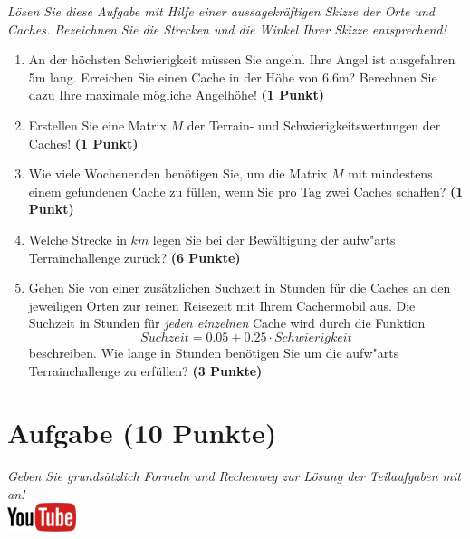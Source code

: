 \documentclass[a4paper, 10pt]{scrartcl}\usepackage[]{graphicx}\usepackage[]{xcolor}
\begin{document}
\textit{L{\"o}sen Sie diese Aufgabe mit Hilfe einer aussagekr{\"a}ftigen Skizze der
  Orte und Caches. Bezeichnen Sie die Strecken und die Winkel Ihrer Skizze
  entsprechend!}

\begin{enumerate}
\item An der h{\"o}chsten Schwierigkeit m{\"u}ssen Sie angeln. Ihre Angel ist
  ausgefahren 5m lang. Erreichen Sie einen Cache in der H{\"o}he
  von 6.6m?  Berechnen Sie dazu Ihre maximale m{\"o}gliche
  Angelh{\"o}he! \textbf{(1 Punkt)}
\item Erstellen Sie eine Matrix $M$ der Terrain- und Schwierigkeitswertungen
  der Caches! \textbf{(1 Punkt)}  
\item Wie viele Wochenenden ben{\"o}tigen Sie, um die Matrix $M$ mit mindestens
  einem gefundenen Cache zu f{\"u}llen, wenn Sie
  pro Tag zwei Caches schaffen? \textbf{(1 Punkt)} 
\item Welche Strecke in $km$ legen Sie bei der Bew{\"a}ltigung der
  aufw{"a}rts Terrainchallenge zur{\"u}ck? \textbf{(6
    Punkte)}
\item Gehen Sie von einer zus{\"a}tzlichen Suchzeit in Stunden f{\"u}r die
  Caches an den jeweiligen Orten zur reinen Reisezeit mit Ihrem Cachermobil
  aus. Die Suchzeit in Stunden f{\"u}r \textit{jeden einzelnen} Cache wird durch die
  Funktion
  \begin{equation*}
    Suchzeit = 0.05 + 0.25 \cdot Schwierigkeit
  \end{equation*}  
  beschreiben.  Wie lange in Stunden ben{\"o}tigen Sie um die
  aufw{"a}rts Terrainchallenge zu erf{\"u}llen? \textbf{(3 Punkte)} 
\end{enumerate}


\clearpage\null
\clearpage\null 
\clearpage

\section{Aufgabe \hfill (10 Punkte)}

\textit{Geben Sie grunds{\"a}tzlich Formeln und Rechenweg zur L{\"o}sung der
  Teilaufgaben mit an!} \\[1Ex]

\hfill\href{https://youtu.be/4-dSaPMhK9s}{\includegraphics[width =
  2cm]{img/youtube}} %
\hspace{2Ex}
\end{document}
